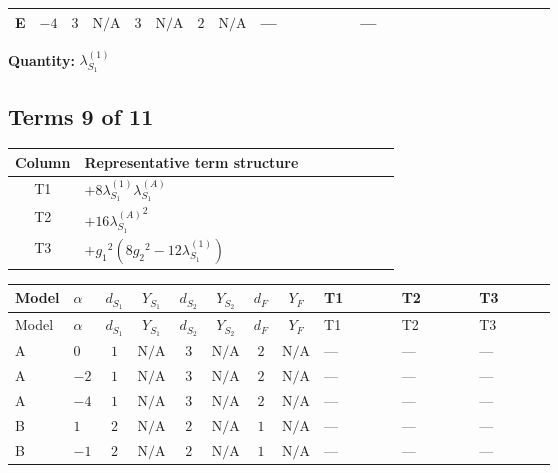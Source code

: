 \documentclass[8pt]{article}
\begin{document}
\begin{landscape}
\begin{longtable}{@{}llcccccc >{\raggedright\arraybackslash}p{0.21\linewidth} >{\raggedright\arraybackslash}p{0.21\linewidth} >{\raggedright\arraybackslash}p{0.21\linewidth}@{}}
\midrule
E & $-4$ & $3$ & $\text{N/A}$ & $3$ & $\text{N/A}$ & $2$ & $\text{N/A}$ & --- & --- & \scriptsize\adjustbox{max width=\linewidth}{$\begin{gathered} 22 {g_2}^4\end{gathered}$} \\
\midrule
\bottomrule
\end{longtable}
\clearpage
\noindent\textbf{Quantity: }$\lambda_{S_1}^{(1)}$\par\smallskip
\subsection*{Terms 9 of 11}
\begin{center}
\begin{tabular}{@{}c >{\raggedright\arraybackslash}p{0.82\linewidth}@{}}
\toprule
Column & Representative term structure \\
\midrule
T1 & \(\displaystyle +8 {\lambda_{S_1}^{(1)}} {\lambda_{S_1}^{(A)}}\) \\
\midrule
T2 & \(\displaystyle +16 {\lambda_{S_1}^{(A)}}^2\) \\
\midrule
T3 & \(\displaystyle +{g_1}^2 \left(8 {g_2}^2-12 {\lambda_{S_1}^{(1)}}\right)\) \\
\midrule
\bottomrule
\end{tabular}
\end{center}
\smallskip
\tiny
\begin{longtable}{@{}llcccccc >{\raggedright\arraybackslash}p{0.21\linewidth} >{\raggedright\arraybackslash}p{0.21\linewidth} >{\raggedright\arraybackslash}p{0.21\linewidth}@{}}
\toprule
Model & $\alpha$ & $d_{S_1}$ & $Y_{S_1}$ & $d_{S_2}$ & $Y_{S_2}$ & $d_F$ & $Y_F$ & T1 & T2 & T3 \\
\midrule
\endfirsthead
\toprule
Model & $\alpha$ & $d_{S_1}$ & $Y_{S_1}$ & $d_{S_2}$ & $Y_{S_2}$ & $d_F$ & $Y_F$ & T1 & T2 & T3 \\
\midrule
\endhead
A & $0$ & $1$ & $\text{N/A}$ & $3$ & $\text{N/A}$ & $2$ & $\text{N/A}$ & --- & --- & --- \\
\midrule
A & $-2$ & $1$ & $\text{N/A}$ & $3$ & $\text{N/A}$ & $2$ & $\text{N/A}$ & --- & --- & --- \\
\midrule
A & $-4$ & $1$ & $\text{N/A}$ & $3$ & $\text{N/A}$ & $2$ & $\text{N/A}$ & --- & --- & --- \\
\midrule
B & $1$ & $2$ & $\text{N/A}$ & $2$ & $\text{N/A}$ & $1$ & $\text{N/A}$ & --- & --- & --- \\
\midrule
B & $-1$ & $2$ & $\text{N/A}$ & $2$ & $\text{N/A}$ & $1$ & $\text{N/A}$ & --- & --- & --- \\

\end{longtable}
\end{landscape}
\end{document}
